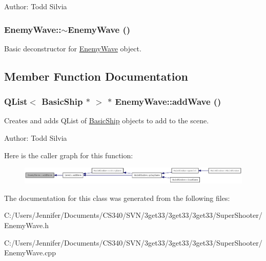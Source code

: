 Author: Todd Silvia \hypertarget{class_enemy_wave_aa33b60498a02e1543cdcf479e004ef1c}{
\subsubsection[{$\sim$EnemyWave}]{\setlength{\rightskip}{0pt plus 5cm}EnemyWave::$\sim$EnemyWave ()}}
\label{class_enemy_wave_aa33b60498a02e1543cdcf479e004ef1c}
Basic deconstructor for \hyperlink{class_enemy_wave}{EnemyWave} object. 

\subsection{Member Function Documentation}
\hypertarget{class_enemy_wave_a804ba9a3d38d5050decbf58c18c06851}{
\subsubsection[{addWave}]{\setlength{\rightskip}{0pt plus 5cm}QList$<$ {\bf BasicShip} $\ast$ $>$ $\ast$ EnemyWave::addWave ()}}
\label{class_enemy_wave_a804ba9a3d38d5050decbf58c18c06851}
Creates and adds QList of \hyperlink{class_basic_ship}{BasicShip} objects to add to the scene.

Author: Todd Silvia 

Here is the caller graph for this function:\nopagebreak
\begin{figure}[H]
\begin{center}
\leavevmode
\includegraphics[width=420pt]{class_enemy_wave_a804ba9a3d38d5050decbf58c18c06851_icgraph}
\end{center}
\end{figure}


The documentation for this class was generated from the following files:\begin{DoxyCompactItemize}
\item 
C:/Users/Jennifer/Documents/CS340/SVN/3get33/3get33/3get33/SuperShooter/EnemyWave.h\item 
C:/Users/Jennifer/Documents/CS340/SVN/3get33/3get33/3get33/SuperShooter/EnemyWave.cpp\end{DoxyCompactItemize}
